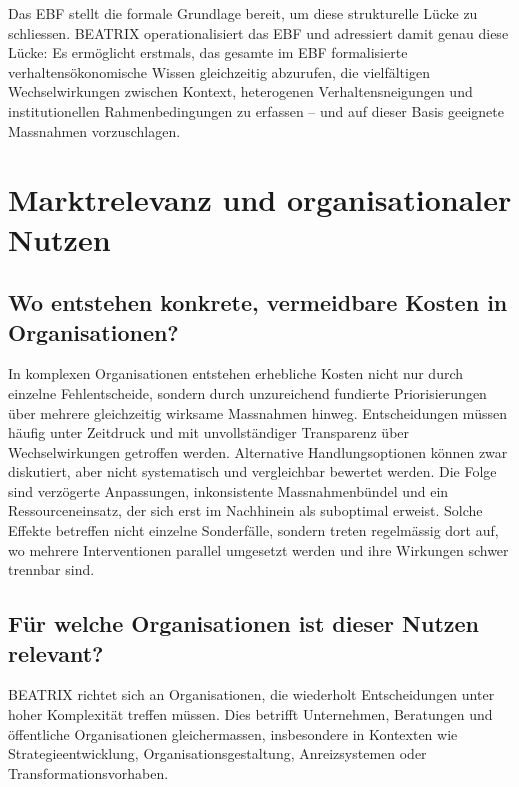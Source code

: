 \documentclass[11pt,a4paper]{article}
\begin{document}
Das EBF stellt die formale Grundlage bereit, um diese strukturelle Lücke zu schliessen. BEATRIX operationalisiert das EBF und adressiert damit genau diese Lücke: Es ermöglicht erstmals, das gesamte im EBF formalisierte verhaltensökonomische Wissen gleichzeitig abzurufen, die vielfältigen Wechselwirkungen zwischen Kontext, heterogenen Verhaltensneigungen und institutionellen Rahmenbedingungen zu erfassen -- und auf dieser Basis geeignete Massnahmen vorzuschlagen.

\newpage


\section{Marktrelevanz und organisationaler Nutzen}

\subsection{Wo entstehen konkrete, vermeidbare Kosten in Organisationen?}

In komplexen Organisationen entstehen erhebliche Kosten nicht nur durch einzelne Fehlentscheide, sondern durch unzureichend fundierte Priorisierungen über mehrere gleichzeitig wirksame Massnahmen hinweg. Entscheidungen müssen häufig unter Zeitdruck und mit unvollständiger Transparenz über Wechselwirkungen getroffen werden. Alternative Handlungsoptionen können zwar diskutiert, aber nicht systematisch und vergleichbar bewertet werden. Die Folge sind verzögerte Anpassungen, inkonsistente Massnahmenbündel und ein Ressourceneinsatz, der sich erst im Nachhinein als suboptimal erweist. Solche Effekte betreffen nicht einzelne Sonderfälle, sondern treten regelmässig dort auf, wo mehrere Interventionen parallel umgesetzt werden und ihre Wirkungen schwer trennbar sind.

\subsection{Für welche Organisationen ist dieser Nutzen relevant?}

BEATRIX richtet sich an Organisationen, die wiederholt Entscheidungen unter hoher Komplexität treffen müssen. Dies betrifft Unternehmen, Beratungen und öffentliche Organisationen gleichermassen, insbesondere in Kontexten wie Strategieentwicklung, Organisationsgestaltung, Anreizsystemen oder Transformationsvorhaben.
\end{document}
